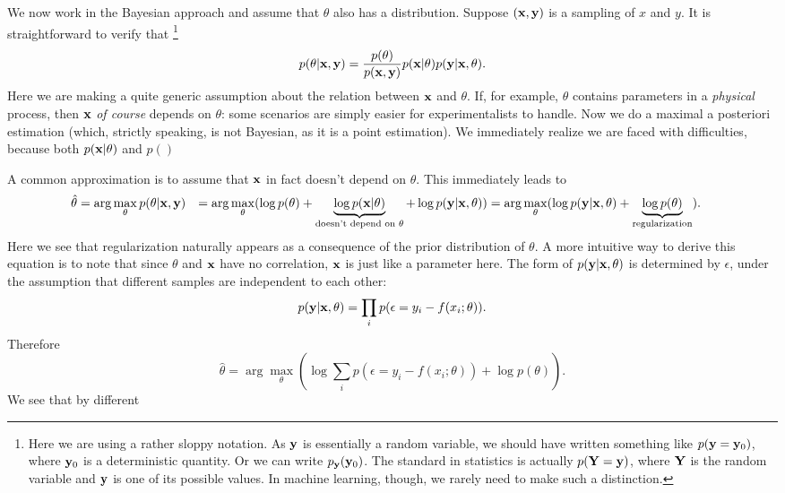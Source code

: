 \documentclass[hyperref, a4paper, 12pt]{report}
\newcommand*{\argmax}{\arg\max}
\def\\{}%
\begin{document}
We now work in the Bayesian approach and assume that $\theta$ also has a distribution.
Suppose $(\vb{x}, \vb{y})$ is a sampling of $x$ and $y$.
It is straightforward to verify that%
\footnote{
    Here we are using a rather sloppy notation.
    As $\vb{y}$ is essentially a random variable,
    we should have written something like $p(\vb{y} = \vb{y}_0)$, where $\vb{y}_0$ is a deterministic quantity.
    Or we can write $p_{\vb{y}}(\vb{y}_0)$.
    The standard in statistics is actually $p(\vb{Y} = \vb{y})$,
    where $\vb{Y}$ is the random variable and $\vb{y}$ is one of its possible values.
    In machine learning, though, we rarely need to make such a distinction.
}
\begin{equation}
    p(\theta | \vb{x}, \vb{y}) = \frac{p(\theta)}{p(\vb{x}, \vb{y})} p(\vb{x} | \theta) p(\vb{y} | \vb{x}, \theta).
\end{equation}
Here we are making a quite generic assumption about the relation between $\vb{x}$ and $\theta$.
If, for example, $\theta$ contains parameters in a \emph{physical} process,
then $\vb{x}$ \emph{of course} depends on $\theta$:
some scenarios are simply easier for experimentalists to handle.
Now we do a maximal a posteriori estimation (which, strictly speaking, is not Bayesian, as it is a point estimation).
We immediately realize we are faced with difficulties,
because both $p(\vb{x} | \theta)$ and $p()$

A common approximation is to assume that $\vb{x}$ in fact doesn't depend on $\theta$.
This immediately leads to 
\begin{equation}
    \begin{aligned}
        \hat{\theta} &= \argmax_\theta p(\theta | \vb{x}, \vb{y}) \\
        &= \argmax_\theta (\log p(\theta) + \underbrace{\log p(\vb{x} | \theta)}_{\text{doesn't  depend on $\theta$}} + \log p(\vb{y} | \vb{x}, \theta)) \\
        &= \argmax_\theta (\log p(\vb{y} | \vb{x}, \theta) + \underbrace{\log p(\theta)}_{\text{regularization}}) .
    \end{aligned}
\end{equation}
Here we see that regularization naturally appears as a consequence of the prior distribution of $\theta$.
A more intuitive way to derive this equation is to note that since $\theta$ and $\vb{x}$ have no correlation,
$\vb{x}$ is just like a parameter here.
The form of $p(\vb{y} | \vb{x}, \theta)$ is determined by $\epsilon$,
under the assumption that different samples are independent to each other:
\begin{equation}
    p(\vb{y} | \vb{x}, \theta) = \prod_i p(\epsilon = y_i - f(x_i; \theta)).
\end{equation}
Therefore 
\begin{equation}
    \hat{\theta} = \argmax_\theta \left( \log \sum_i p(\epsilon = y_i- f(x_i; \theta)) + \log p(\theta) \right).
\end{equation}
We see that by different 
\end{document}
